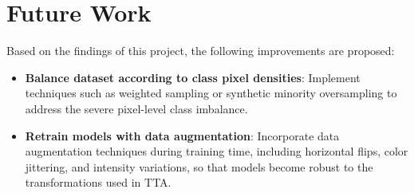 \documentclass[12pt,a4paper]{article}
\begin{document}
\section{Future Work}

Based on the findings of this project, the following improvements are proposed:

\begin{itemize}
    \item \textbf{Balance dataset according to class pixel densities}: Implement techniques such as weighted sampling or synthetic minority oversampling to address the severe pixel-level class imbalance.
    
    \item \textbf{Retrain models with data augmentation}: Incorporate data augmentation techniques during training time, including horizontal flips, color jittering, and intensity variations, so that models become robust to the transformations used in TTA.
\end{itemize}
\end{document}
